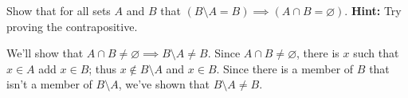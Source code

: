 \documentclass[12pt,fleqn,answers]{exam}
\newcommand{\intersection}{\cap}
\begin{document}
\begin{questions}
\begin{solution}
\end{solution}

\question  Show that for all sets $A$ and $B$ that $\left(B \setminus  A = B \right)  \implies \left( A \intersection B = \varnothing \right)$.
\textbf{Hint:} Try proving the contrapositive.

\begin{solution}
We'll show that $A \intersection B \neq \varnothing \implies B \setminus  A \neq B$.
Since $A \intersection B \neq \varnothing$, there is $x$ such that $x \in A$ add
$x \in B$; thus $x \notin B \setminus  A$ and $x \in B$. Since there is a member 
of $B$ that isn't a member of $B \setminus  A$, we've shown that $B \setminus  A \neq B$.


\end{solution}






\end{questions}
\end{document}
